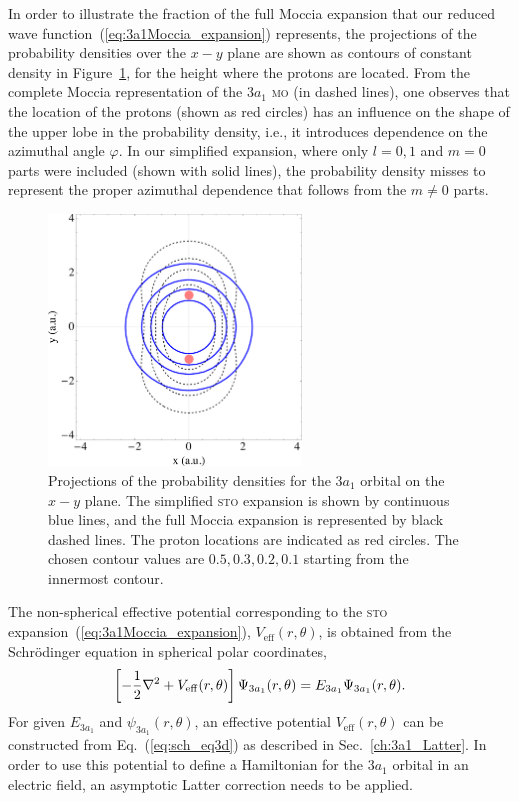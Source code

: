 In order to illustrate the fraction of the full Moccia expansion that
our reduced wave function~(\ref{eq:3a1Moccia_expansion}) represents,
the projections of the probability densities over the $x-y$ plane are
shown as contours of constant density in
Figure~\ref{fig:3a1_xycontours}, for the height where the protons are
located. From the complete Moccia representation of the $3a_{1}$
\textsc{mo} (in dashed lines), one observes that the location of the
protons (shown as red circles) has an influence on the shape of the
upper lobe in the probability density, i.e., it introduces dependence
on the azimuthal angle $\varphi$. In our simplified expansion, where
only $l=0,1$ and $m=0$ parts were included (shown with solid lines),
the probability density misses to represent the proper azimuthal
dependence that follows from the $m\neq 0$ parts.

\begin{figure}
  \centering
  \includegraphics[width=0.6\textwidth]{figures/ch_H2O/3a1/orbitals3a1.eps}
  \caption{Projections of the probability densities for the $3a_{1}$
    orbital on the $x-y$ plane. The simplified \textsc{sto} expansion
    is shown by continuous blue lines, and the full Moccia expansion
    is represented by black dashed lines. The proton locations are
    indicated as red circles. The chosen contour values are $0.5, 0.3,
    0.2, 0.1$ starting from the innermost contour.}
  \label{fig:3a1_xycontours}
\end{figure}

The non-spherical effective potential corresponding to the
\textsc{sto} expansion~(\ref{eq:3a1Moccia_expansion}),
$V_{\mathrm{eff}}(r,\theta)$, is obtained from the Schr\"{o}dinger
equation in spherical polar coordinates,
%
\begin{eqnarray}
  \left[ -\frac{1}{2} \nabla^{2} +
  V_{\rm{eff}}(r,\theta) \right] \Psi_{3a_{1}}(r,\theta) =
  E_{3a_{1}} \Psi_{3a_{1}}(r,\theta).
\label{eq:sch_eq3d}
\end{eqnarray}
%
For given $E_{3a_{1}}$ and $\psi_{3a_{1}}(r,\theta)$, an effective
potential $V_{\mathrm{eff}}(r,\theta)$ can be constructed from
Eq.~(\ref{eq:sch_eq3d}) as described in Sec.~\ref{ch:3a1_Latter}. In
order to use this potential to define a Hamiltonian for the $3a_{1}$
orbital in an electric field, an asymptotic Latter correction needs to
be applied.

